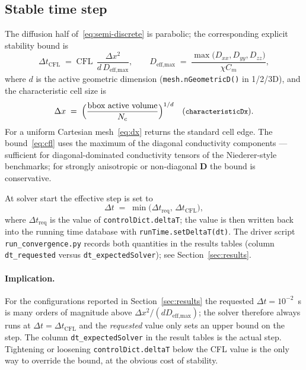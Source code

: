 \documentclass[11pt,a4paper]{article}
\newcommand{\Dten}{\mathbf{D}}
\newcommand{\code}[1]{\texttt{\small #1}}
\begin{document}
\subsection{Stable time step}
\label{sec:cfl}

The diffusion half of~\eqref{eq:semi-discrete} is parabolic; the
corresponding explicit stability bound is
\begin{equation}
  \Delta t_{\text{CFL}}
   \;=\;
   \text{CFL}\;\,
   \frac{\Delta x^{2}}{d\, D_{\text{eff,max}}},
   \qquad
   D_{\text{eff,max}}
   \;=\;
   \frac{\max\!\bigl(D_{xx}, D_{yy}, D_{zz}\bigr)}{\chi C_{m}},
   \label{eq:cfl}
\end{equation}
where $d$ is the active geometric dimension (\code{mesh.nGeometricD()}
in 1/2/3D), and the characteristic cell size is
\begin{equation}
  \Delta x \;=\;
   \Bigl(
     \frac{
       \text{bbox active volume}
     }{N_{c}}
   \Bigr)^{1/d}
   \quad\text{(\code{characteristicDx})}.
   \label{eq:dx}
\end{equation}
For a uniform Cartesian mesh~\eqref{eq:dx} returns the standard cell
edge. The bound~\eqref{eq:cfl} uses the maximum of the diagonal
conductivity components — sufficient for diagonal-dominated
conductivity tensors of the Niederer-style benchmarks; for strongly
anisotropic or non-diagonal $\Dten$ the bound is conservative.

At solver start the effective step is set to
\begin{equation}
  \Delta t \;=\; \min\!\bigl(\Delta t_{\text{req}},\,\Delta t_{\text{CFL}}\bigr),
\end{equation}
where $\Delta t_{\text{req}}$ is the value of
\code{controlDict.deltaT}; the value is then written back into the
running time database with \code{runTime.setDeltaT(dt)}. The driver
script \code{run\_convergence.py} records both quantities in the
results tables (column \code{dt\_requested} versus
\code{dt\_expectedSolver}); see Section~\ref{sec:results}.

\paragraph{Implication.}
For the configurations reported in Section~\ref{sec:results} the
requested $\Delta t = 10^{-2}$~s is many orders of magnitude above
$\Delta x^{2}/(d D_{\text{eff,max}})$; the solver therefore always
runs at $\Delta t = \Delta t_{\text{CFL}}$ and the
\emph{requested} value only sets an upper bound on the step. The
column \code{dt\_expectedSolver} in the result tables is the actual
step. Tightening or loosening \code{controlDict.deltaT} below the
CFL value is the only way to override the bound, at the obvious cost
of stability.
\end{document}
